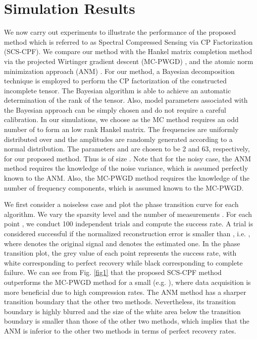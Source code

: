 \documentclass[10pt,journal,epsfig]{IEEEtran}
\begin{document}
\section{Simulation Results}
We now carry out experiments to illustrate the performance of the
proposed method which is referred to as Spectral Compressed
Sensing via CP Factorization (SCS-CPF). We compare our method with
the Hankel matrix completion method via the projected Wirtinger
gradient descent (MC-PWGD) \cite{CaiLiu15}, and the atomic norm
minimization approach (ANM) \cite{TangBhaskar13,BhaskarTang13}.
For our method, a Bayesian decomposition technique
\cite{ZhaoZhang15} is employed to perform the CP factorization of
the constructed incomplete tensor. The Bayesian algorithm is able
to achieve an automatic determination of the rank of the tensor.
Also, model parameters associated with the Bayesian approach can
be simply chosen and do not require a careful calibration. In our
simulations, we choose  as the MC method \cite{CaiLiu15}
requires an odd number of  to form an 
low rank Hankel matrix. The frequencies  are
uniformly distributed over  and the amplitudes 
are randomly generated according to a normal distribution. The
parameters  and  are chosen to be 2 and 63, respectively,
for our proposed method. Thus  is of
size . Note that for the noisy case, the ANM
method requires the knowledge of the noise variance, which is
assumed perfectly known to the ANM. Also, the MC-PWGD method
requires the knowledge of the number of frequency components,
which is assumed known to the MC-PWGD.


We first consider a noiseless case and plot the phase transition
curve for each algorithm. We vary the sparsity level 
and the number of measurements . For each point
, we conduct 100 independent trials and compute the success
rate. A trial is considered successful if the normalized
reconstruction error is smaller than , i.e.
,
where  denotes the
original signal and  denotes the estimated
one. In the phase transition plot, the grey value of each point
represents the success rate, with white corresponding to perfect
recovery while black corresponding to complete failure. We can see
from Fig. \ref{fig1} that the proposed SCS-CPF method outperforms
the MC-PWGD method for a small  (e.g. ), where data
acquisition is more beneficial due to high compression rates. The
ANM method has a sharper transition boundary that the other two
methods. Nevertheless, its transition boundary is highly blurred
and the size of the white area below the transition boundary is
smaller than those of the other two methods, which implies that
the ANM is inferior to the other two methods in terms of perfect
recovery rates.
\end{document}
